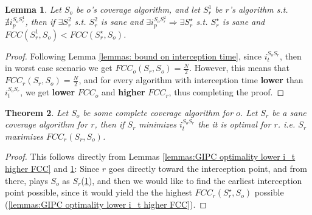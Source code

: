 \documentclass[a4paper,10pt]{article}
\newtheorem{theorem}{Theorem}[section]
\newtheorem{lemma}[theorem]{Lemma}
\newcommand\rob{\ensuremath{r}\xspace}
\newcommand\opp{\ensuremath{o}\xspace}
\newcommand{\fcc}{\ensuremath{FCC}\xspace}
\begin{document}
\begin{lemma} \label{lemmas: GIPC optimality prefer S with i_p}
Let $S_{\opp}$ be \opp's coverage algorithm, and let $S_{\rob}^1$ be \rob's algorithm s.t. $\nexists i_p^{S_{\opp} S_{\rob}^1}$, then if $\exists S_{\rob}^2$ s.t. $S_{\rob}^2$ is sane and $\exists i_p^{S_{\opp} S_{\rob}^2}\Rightarrow \exists S_{\rob}^{\star}$ s.t. $S_{\rob}^{\star}$ is sane and $\fcc(S_{\rob}^1, S_{\opp}) < \fcc(S_{\rob}^{\star}, S_{\opp})$.
\end{lemma}

\begin{proof}
Following Lemma \ref{lemmas: bound on interception time}, since $i_t^{S_{\opp} S_{\rob}}$, then in worst case scenario we get $\fcc_{\opp}(S_{\rob}, S_{\opp})=
\frac{N}{2}$. However, this means that $\fcc_{\rob}(S_{\rob}, S_{\opp})=\frac{N}{2}$, and for every algorithm with interception time \textbf{lower} than $i_t^{S_{\opp} S_{\rob}}$, we get \textbf{lower} $\fcc_{\opp}$ and \textbf{higher} $\fcc_{\rob}$, thus completing the proof.
\end{proof}

\begin{theorem}\label{theorems:FullInformationStrategy}
Let $S_{\opp}$ be some complete coverage algorithm for \opp. Let $S_{\rob}$ be a sane coverage algorithm for \rob, then if $S_{\rob}$ minimizes $i_t^{S_{\opp} S_{\rob}}$ the it is optimal for \rob. i.e. $S_{\rob}$ maximizes $\fcc_{\rob}(S_{\rob}, S_{\opp})$.
\end{theorem}
\begin{proof}
This follows directly from Lemmas \ref{lemmas:GIPC optimality lower i_t higher FCC}  and \ref{lemmas: GIPC optimality prefer S with i_p}: Since \rob goes directly toward the interception point, and from there, plays $S_{\opp}$ as $S_{\rob}$(\ref{lemmas: GIPC optimality prefer S with i_p}), and then we would like to find the earliest interception point possible, since it would yield the the highest $\fcc_{\rob}(S_{\rob}^\star, S_{\opp})$ possible (\ref{lemmas:GIPC optimality lower i_t higher FCC}).
\end{proof}
\end{document}
